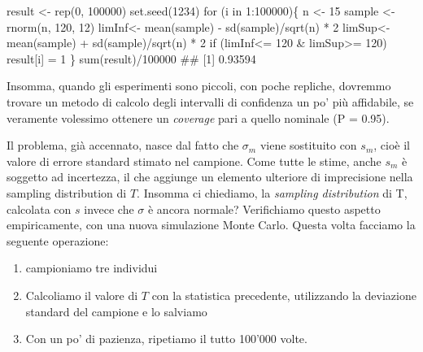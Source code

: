 \documentclass[a4paper,12pt,oneside]{book}
\providecommand{\tightlist}{%
  \setlength{\itemsep}{0pt}\setlength{\parskip}{0pt}}
\newenvironment{Shaded}{}{}
\newcommand{\KeywordTok}[1]{#1}
\newcommand{\DecValTok}[1]{#1}
\newcommand{\StringTok}[1]{#1}
\newcommand{\CommentTok}[1]{#1}
\newcommand{\ControlFlowTok}[1]{#1}
\newcommand{\OperatorTok}[1]{#1}
\newcommand{\NormalTok}[1]{#1}
\begin{document}
\begin{Shaded}
\begin{Highlighting}[]
\NormalTok{result <-}\StringTok{ }\KeywordTok{rep}\NormalTok{(}\DecValTok{0}\NormalTok{, }\DecValTok{100000}\NormalTok{)}
\KeywordTok{set.seed}\NormalTok{(}\DecValTok{1234}\NormalTok{)}
\ControlFlowTok{for}\NormalTok{ (i }\ControlFlowTok{in} \DecValTok{1}\OperatorTok{:}\DecValTok{100000}\NormalTok{)\{}
\NormalTok{  n <-}\StringTok{ }\DecValTok{15}
\NormalTok{  sample <-}\StringTok{ }\KeywordTok{rnorm}\NormalTok{(n, }\DecValTok{120}\NormalTok{, }\DecValTok{12}\NormalTok{)}
\NormalTok{  limInf<-}\StringTok{ }\KeywordTok{mean}\NormalTok{(sample) }\OperatorTok{-}\StringTok{ }\KeywordTok{sd}\NormalTok{(sample)}\OperatorTok{/}\KeywordTok{sqrt}\NormalTok{(n) }\OperatorTok{*}\StringTok{ }\DecValTok{2} 
\NormalTok{  limSup<-}\StringTok{ }\KeywordTok{mean}\NormalTok{(sample) }\OperatorTok{+}\StringTok{ }\KeywordTok{sd}\NormalTok{(sample)}\OperatorTok{/}\KeywordTok{sqrt}\NormalTok{(n) }\OperatorTok{*}\StringTok{ }\DecValTok{2}
  \ControlFlowTok{if}\NormalTok{ (limInf}\OperatorTok{<=}\StringTok{ }\DecValTok{120} \OperatorTok{&}\StringTok{ }\NormalTok{limSup}\OperatorTok{>=}\StringTok{ }\DecValTok{120}\NormalTok{) result[i] =}\StringTok{ }\DecValTok{1}
\NormalTok{\}}
\KeywordTok{sum}\NormalTok{(result)}\OperatorTok{/}\DecValTok{100000}
\CommentTok{## [1] 0.93594}
\end{Highlighting}
\end{Shaded}

Insomma, quando gli esperimenti sono piccoli, con poche repliche, dovremmo trovare un metodo di calcolo degli intervalli di confidenza un po' più affidabile, se veramente volessimo ottenere un \emph{coverage} pari a quello nominale (P = 0.95).

Il problema, già accennato, nasce dal fatto che \(\sigma_m\) viene sostituito con \(s_m\), cioè il valore di errore standard stimato nel campione. Come tutte le stime, anche \(s_m\) è soggetto ad incertezza, il che aggiunge un elemento ulteriore di imprecisione nella sampling distribution di \(T\). Insomma ci chiediamo, la \emph{sampling distribution} di T, calcolata con \(s\) invece che \(\sigma\) è ancora normale? Verifichiamo questo aspetto empiricamente, con una nuova simulazione Monte Carlo. Questa volta facciamo la seguente operazione:

\begin{enumerate}
\def\labelenumi{\arabic{enumi}.}
\tightlist
\item
  campioniamo tre individui
\item
  Calcoliamo il valore di \(T\) con la statistica precedente, utilizzando la deviazione standard del campione e lo salviamo
\item
  Con un po' di pazienza, ripetiamo il tutto 100'000 volte.
\end{enumerate}
\end{document}
